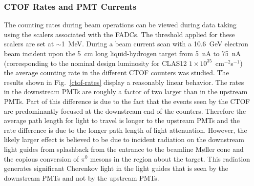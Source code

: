 \documentclass{elsart}
\begin{document}
\subsubsection{CTOF Rates and PMT Currents}

The counting rates during beam operations can be viewed during data taking using the scalers
associated with the FADCs. The threshold applied for these scalers are set at $\sim$1~MeV. During
a beam current scan with a 10.6~GeV electron beam incident upon the 5~cm long liquid-hydrogen target
from 5~nA to 75~nA (corresponding to the nominal design luminosity for CLAS12
$1 \times 10^{35}$~cm$^{-2}$s$^{-1}$) the average counting rate in the different CTOF counters was
studied. The results shown in Fig.~\ref{ctof-rates} display a reasonably linear behavior. The rates in
the downstream PMTs are roughly a factor of two larger than in the upstream PMTs. Part of this
difference is due to the fact that the events seen by the CTOF are predominantly focused at the
downstream end of the counters. Therefore the average path length for light to travel is longer to
the upstream PMTs and the rate difference is due to the longer path length of light attenuation. However,
the likely larger effect is believed to be due to incident radiation on the downstream light guides from
splashback from the entrance to the beamline M{\o}ller cone and the copious conversion of $\pi^0$
mesons in the region about the target. This radiation generates significant Cherenkov light in the light
guides that is seen by the downstream PMTs and not by the upstream PMTs.
\end{document}
